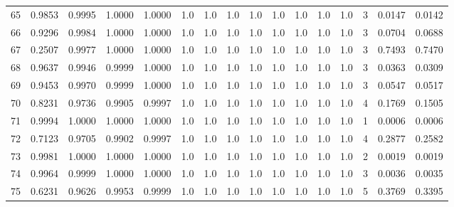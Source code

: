\begin{tabular}{lrrrrrrrrrrrrrrr}
65  &      0.9853 &  0.9995 &  1.0000 &  1.0000 &     1.0 &     1.0 &     1.0 &     1.0 &     1.0 &     1.0 &      1.0 &        1.0 &      3 &                    0.0147 &                     0.0142 \\
66  &      0.9296 &  0.9984 &  1.0000 &  1.0000 &     1.0 &     1.0 &     1.0 &     1.0 &     1.0 &     1.0 &      1.0 &        1.0 &      3 &                    0.0704 &                     0.0688 \\
67  &      0.2507 &  0.9977 &  1.0000 &  1.0000 &     1.0 &     1.0 &     1.0 &     1.0 &     1.0 &     1.0 &      1.0 &        1.0 &      3 &                    0.7493 &                     0.7470 \\
68  &      0.9637 &  0.9946 &  0.9999 &  1.0000 &     1.0 &     1.0 &     1.0 &     1.0 &     1.0 &     1.0 &      1.0 &        1.0 &      3 &                    0.0363 &                     0.0309 \\
69  &      0.9453 &  0.9970 &  0.9999 &  1.0000 &     1.0 &     1.0 &     1.0 &     1.0 &     1.0 &     1.0 &      1.0 &        1.0 &      3 &                    0.0547 &                     0.0517 \\
70  &      0.8231 &  0.9736 &  0.9905 &  0.9997 &     1.0 &     1.0 &     1.0 &     1.0 &     1.0 &     1.0 &      1.0 &        1.0 &      4 &                    0.1769 &                     0.1505 \\
71  &      0.9994 &  1.0000 &  1.0000 &  1.0000 &     1.0 &     1.0 &     1.0 &     1.0 &     1.0 &     1.0 &      1.0 &        1.0 &      1 &                    0.0006 &                     0.0006 \\
72  &      0.7123 &  0.9705 &  0.9902 &  0.9997 &     1.0 &     1.0 &     1.0 &     1.0 &     1.0 &     1.0 &      1.0 &        1.0 &      4 &                    0.2877 &                     0.2582 \\
73  &      0.9981 &  1.0000 &  1.0000 &  1.0000 &     1.0 &     1.0 &     1.0 &     1.0 &     1.0 &     1.0 &      1.0 &        1.0 &      2 &                    0.0019 &                     0.0019 \\
74  &      0.9964 &  0.9999 &  1.0000 &  1.0000 &     1.0 &     1.0 &     1.0 &     1.0 &     1.0 &     1.0 &      1.0 &        1.0 &      3 &                    0.0036 &                     0.0035 \\
75  &      0.6231 &  0.9626 &  0.9953 &  0.9999 &     1.0 &     1.0 &     1.0 &     1.0 &     1.0 &     1.0 &      1.0 &        1.0 &      5 &                    0.3769 &                     0.3395 \\

\end{tabular}
